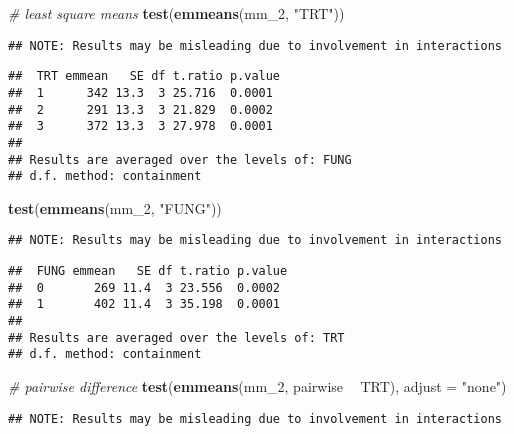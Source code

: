 \documentclass[]{book}
\newenvironment{Shaded}{\begin{snugshade}}{\end{snugshade}}
\newcommand{\CommentTok}[1]{\textcolor[rgb]{0.56,0.35,0.01}{\textit{#1}}}
\newcommand{\DataTypeTok}[1]{\textcolor[rgb]{0.13,0.29,0.53}{#1}}
\newcommand{\DecValTok}[1]{\textcolor[rgb]{0.00,0.00,0.81}{#1}}
\newcommand{\KeywordTok}[1]{\textcolor[rgb]{0.13,0.29,0.53}{\textbf{#1}}}
\newcommand{\NormalTok}[1]{#1}
\newcommand{\OperatorTok}[1]{\textcolor[rgb]{0.81,0.36,0.00}{\textbf{#1}}}
\newcommand{\StringTok}[1]{\textcolor[rgb]{0.31,0.60,0.02}{#1}}
\begin{document}
\begin{Shaded}
\begin{Highlighting}[]
\CommentTok{# least square means}
\KeywordTok{test}\NormalTok{(}\KeywordTok{emmeans}\NormalTok{(mm_}\DecValTok{2}\NormalTok{, }\StringTok{"TRT"}\NormalTok{))}
\end{Highlighting}
\end{Shaded}

\begin{verbatim}
## NOTE: Results may be misleading due to involvement in interactions
\end{verbatim}

\begin{verbatim}
##  TRT emmean   SE df t.ratio p.value
##  1      342 13.3  3 25.716  0.0001 
##  2      291 13.3  3 21.829  0.0002 
##  3      372 13.3  3 27.978  0.0001 
## 
## Results are averaged over the levels of: FUNG 
## d.f. method: containment
\end{verbatim}

\begin{Shaded}
\begin{Highlighting}[]
\KeywordTok{test}\NormalTok{(}\KeywordTok{emmeans}\NormalTok{(mm_}\DecValTok{2}\NormalTok{, }\StringTok{"FUNG"}\NormalTok{))}
\end{Highlighting}
\end{Shaded}

\begin{verbatim}
## NOTE: Results may be misleading due to involvement in interactions
\end{verbatim}

\begin{verbatim}
##  FUNG emmean   SE df t.ratio p.value
##  0       269 11.4  3 23.556  0.0002 
##  1       402 11.4  3 35.198  0.0001 
## 
## Results are averaged over the levels of: TRT 
## d.f. method: containment
\end{verbatim}

\begin{Shaded}
\begin{Highlighting}[]
\CommentTok{# pairwise difference}
\KeywordTok{test}\NormalTok{(}\KeywordTok{emmeans}\NormalTok{(mm_}\DecValTok{2}\NormalTok{, pairwise }\OperatorTok{~}\StringTok{ }\NormalTok{TRT), }\DataTypeTok{adjust =} \StringTok{"none"}\NormalTok{)}
\end{Highlighting}
\end{Shaded}

\begin{verbatim}
## NOTE: Results may be misleading due to involvement in interactions
\end{verbatim}
\end{document}
